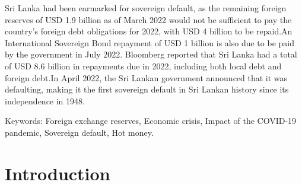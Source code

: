\documentclass[a4paper,12pt]{article}
\begin{document}
Sri Lanka had been earmarked for sovereign default, as the remaining foreign reserves of USD 1.9 billion as of March 2022 would not be sufficient to pay the country's foreign debt obligations for 2022, with USD 4 billion to be repaid.An International Sovereign Bond repayment of USD 1 billion is also due to be paid by the government in July 2022. Bloomberg reported that Sri Lanka had a total of USD 8.6 billion in repayments due in 2022, including both local debt and foreign debt.In April 2022, the Sri Lankan government announced that it was defaulting, making it the first sovereign default in Sri Lankan history since its independence in 1948.

Keywords: Foreign exchange reserves, Economic crisis, Impact of the COVID-19 pandemic, Sovereign default, Hot money.\newline

\newpage

\setlength{\parskip}{0.5ex plus 0.5ex minus 0.2ex}

\small\tableofcontents
\setlength{\parskip}{2ex plus 0.5ex minus 0.2ex}
\newpage





\newpage

\pagestyle{plain}

\section{Introduction}\label{introduction}
\end{document}
